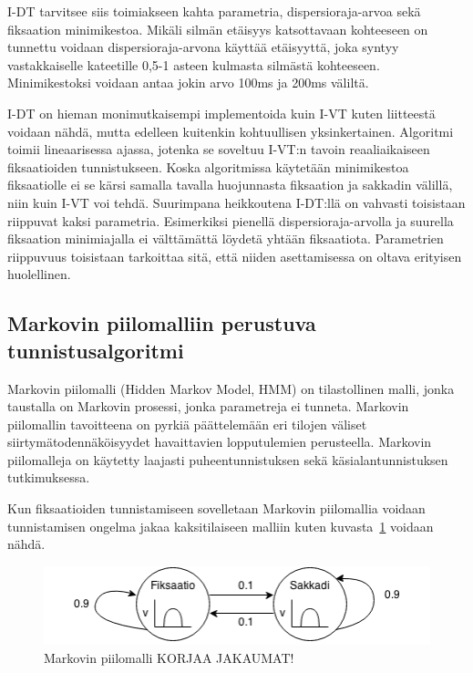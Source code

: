 I-DT tarvitsee siis toimiakseen kahta parametria, dispersioraja-arvoa sekä fiksaation minimikestoa. Mikäli silmän etäisyys katsottavaan kohteeseen on tunnettu voidaan dispersioraja-arvona käyttää etäisyyttä, joka syntyy vastakkaiselle kateetille 0,5-1 asteen kulmasta silmästä kohteeseen. Minimikestoksi voidaan antaa jokin arvo 100ms ja 200ms väliltä. \citep[s. 74]{salvucci2000}

I-DT on hieman monimutkaisempi implementoida kuin I-VT kuten liitteestä \emph{} voidaan nähdä, mutta edelleen kuitenkin kohtuullisen yksinkertainen. Algoritmi toimii lineaarisessa ajassa, jotenka se soveltuu I-VT:n tavoin reaaliaikaiseen fiksaatioiden tunnistukseen. Koska algoritmissa käytetään minimikestoa fiksaatiolle ei se kärsi samalla tavalla huojunnasta fiksaation ja sakkadin välillä, niin kuin I-VT voi tehdä. Suurimpana heikkoutena I-DT:llä on vahvasti toisistaan riippuvat kaksi parametria. Esimerkiksi pienellä dispersioraja-arvolla ja suurella fiksaation minimiajalla ei välttämättä löydetä yhtään fiksaatiota. Parametrien riippuvuus toisistaan tarkoittaa sitä, että niiden asettamisessa on oltava erityisen huolellinen.


\subsection{Markovin piilomalliin perustuva tunnistusalgoritmi}

Markovin piilomalli (Hidden Markov Model, HMM) on tilastollinen malli, jonka taustalla on Markovin prosessi, jonka parametreja ei tunneta. Markovin piilomallin tavoitteena on pyrkiä päättelemään eri tilojen väliset siirtymätodennäköisyydet havaittavien lopputulemien perusteella. Markovin piilomalleja on käytetty laajasti puheentunnistuksen sekä käsialantunnistuksen tutkimuksessa.\citep[s. 257-286]{rabiner1989tutorial}

Kun fiksaatioiden tunnistamiseen sovelletaan Markovin piilomallia voidaan tunnistamisen ongelma jakaa kaksitilaiseen malliin kuten kuvasta~\ref{fig:hmm_sample} voidaan nähdä. 

\begin{figure}[h]
    \includegraphics[width=1.0\textwidth]{HMM.png}
		\caption{Markovin piilomalli KORJAA JAKAUMAT!}
		\label{fig:hmm_sample}
\end{figure}

